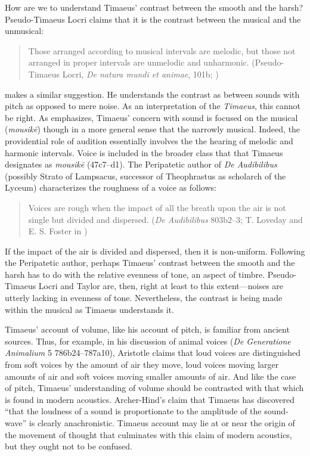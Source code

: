 How are we to understand Timaeus' contrast between the smooth and the harsh? Pseudo-Timaeus Locri claims that it is the contrast between the musical and the unmusical:
\begin{quote}
	Those arranged according to musical intervals are melodic, but those not arranged in proper intervals are unmelodic and unharmonic. (Pseudo-Timaeus Locri, \emph{De natura mundi et animae}, 101b; \citealt[61]{Tobin:1984qf})
\end{quote}
\citet[477]{Taylor:1928qb} makes a similar suggestion. He understands the contrast as between sounds with pitch as opposed to mere noise. As an interpretation of the \emph{Timaeus}, this cannot be right. As \citet[85--6]{Barker:2000dy} emphasizes, Timaeus' concern with sound is focused on the musical (\emph{mousikē}) though in a more general sense that the narrowly musical. Indeed, the providential role of audition essentially involves the the hearing of melodic and harmonic intervals. Voice is included in the broader class that that Timaeus designates as \emph{mousikē} (47c7--d1). The Peripatetic author of \emph{De Audibilibus} (possibly Strato of Lampsacus, successor of Theophrastus as scholarch of the Lyceum) characterizes the roughness of a voice as follows:
\begin{quote}
	Voices are rough when the impact of all the breath upon the air is not single but divided and dispersed. (\emph{De Audibilibus} 803b2--3; T. Loveday and E. S. Foster in \citealt{Barnes:1984uq})
\end{quote}
If the impact of the air is divided and dispersed, then it is non-uniform. Following the Peripatetic author, perhaps Timaeus' contrast between the smooth and the harsh has to do with the relative evenness of tone, an aspect of timbre. Pseudo-Timaeus Locri and Taylor are, then, right at least to this extent---noises are utterly lacking in evenness of tone. Nevertheless, the contrast is being made within the musical as Timaeus understands it.

Timaeus' account of volume, like his account of pitch, is familiar from ancient sources. Thus, for example, in his discussion of animal voices (\emph{De Generatione Animalium} 5 786b24--787a10), Aristotle claims that loud voices are distinguished from soft voices by the amount of air they move, loud voices moving larger amounts of air and soft voices moving smaller amounts of air. And like the case of pitch, Timaeus' understanding of volume should be contrasted with that which is found in modern acoustics. Archer-Hind's \citeyearpar[246 n7]{Archer-Hind:1888qd} claim that Timaeus has discovered ``that the loudness of a sound is proportionate to the amplitude of the sound-wave'' is clearly anachronistic. Timaeus account may lie at or near the origin of the movement of thought that culminates with this claim of modern acoustics, but they ought not to be confused.

